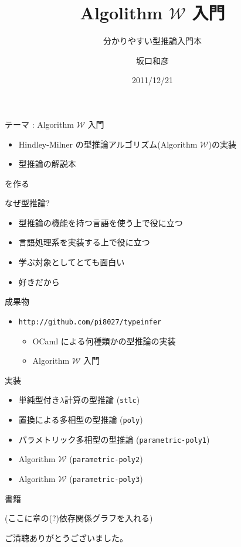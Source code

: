 \documentclass[cjk, 14pt]{beamer}
\title{Algolithm $\mathcal W$ 入門}
\subtitle{分かりやすい型推論入門本}
\author{坂口和彦}
\institute{筑波大学 情報学群 情報科学類 B1}
\date{2011/12/21}
\begin{document}
\begin{frame}[empty]

  \titlepage

\end{frame}

\begin{frame}{テーマ : Algorithm $\mathcal W$ 入門}

 \begin{itemize}
  \item Hindley-Milner の型推論アルゴリズム(Algorithm $\mathcal W$)の実装
  \item 型推論の解説本
 \end{itemize}
 を作る

\end{frame}

\begin{frame}{なぜ型推論?}

 \begin{itemize}
  \item 型推論の機能を持つ言語を使う上で役に立つ
  \item 言語処理系を実装する上で役に立つ
  \item 学ぶ対象としてとても面白い
  \item 好きだから
 \end{itemize}

\end{frame}

\begin{frame}{成果物}

 \begin{itemize}
  \item \texttt{http://github.com/pi8027/typeinfer}
  \begin{itemize}
   \item OCaml による何種類かの型推論の実装
   \item Algorithm $\mathcal W$ 入門
  \end{itemize}
 \end{itemize}


\end{frame}

\begin{frame}{実装}

 \begin{itemize}
  \item 単純型付き$\lambda$計算の型推論 (\texttt{stlc})
  \item 置換による多相型の型推論 (\texttt{poly})
  \item パラメトリック多相型の型推論 (\texttt{parametric-poly1})
  \item Algorithm $\mathcal W$ (\texttt{parametric-poly2})
  \item Algorithm $\mathcal W$ (\texttt{parametric-poly3})
 \end{itemize}

\end{frame}

\begin{frame}{書籍}

 (ここに章の(?)依存関係グラフを入れる)

\end{frame}

\begin{frame}[plain]

 ご清聴ありがとうございました。

\end{frame}
\end{document}
